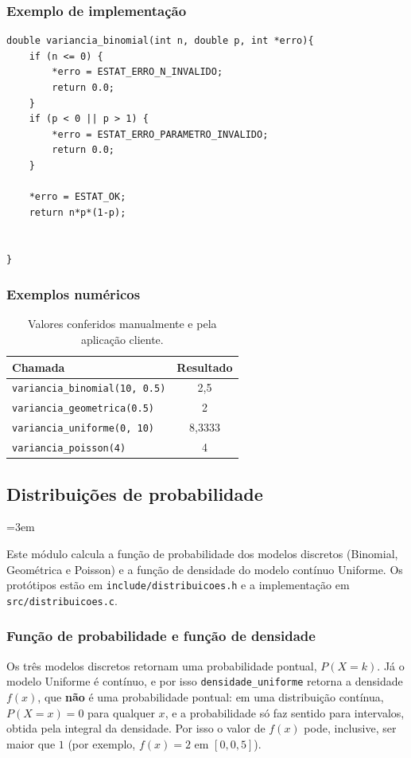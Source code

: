 \documentclass[12pt,a4paper]{article}
\newcommand{\cod}[1]{\texttt{#1}}
\begin{document}
\subsubsection{Exemplo de implementação}
\begin{lstlisting}
double variancia_binomial(int n, double p, int *erro){
    if (n <= 0) {
        *erro = ESTAT_ERRO_N_INVALIDO;
        return 0.0;
    }
    if (p < 0 || p > 1) {
        *erro = ESTAT_ERRO_PARAMETRO_INVALIDO;
        return 0.0;
    }

    *erro = ESTAT_OK;
    return n*p*(1-p);


}
\end{lstlisting}

\subsubsection{Exemplos numéricos}
\begin{table}[h]
\centering
\begin{tabular}{@{}lc@{}}
\toprule
Chamada & Resultado \\
\midrule
\cod{variancia\_binomial(10, 0.5)}   & 2,5 \\
\cod{variancia\_geometrica(0.5)}     & 2 \\
\cod{variancia\_uniforme(0, 10)}     & 8,3333 \\
\cod{variancia\_poisson(4)}          & 4 \\
\bottomrule
\end{tabular}
\caption{Valores conferidos manualmente e pela aplicação cliente.}
\end{table}


\subsection{Distribuições de probabilidade}
\emergencystretch=3em

Este módulo calcula a função de probabilidade dos modelos discretos (Binomial,
Geométrica e Poisson) e a função de densidade do modelo contínuo Uniforme. Os
protótipos estão em \cod{include/distribuicoes.h} e a implementação em
\cod{src/distribuicoes.c}.
 
\subsubsection{Função de probabilidade e função de densidade}
Os três modelos discretos retornam uma probabilidade pontual, $P(X = k)$. Já o
modelo Uniforme é contínuo, e por isso \cod{densidade\_uniforme} retorna a
densidade $f(x)$, que \textbf{não} é uma probabilidade pontual: em uma
distribuição contínua, $P(X = x) = 0$ para qualquer $x$, e a probabilidade só
faz sentido para intervalos, obtida pela integral da densidade. Por isso o valor
de $f(x)$ pode, inclusive, ser maior que $1$ (por exemplo, $f(x) = 2$ em
$[0, 0{,}5]$).
 
\end{document}
